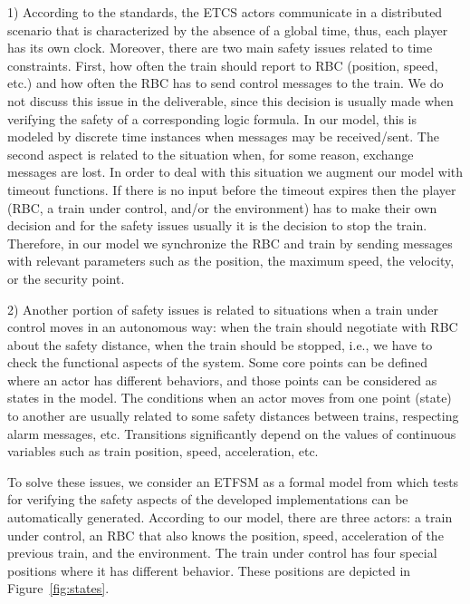 \documentclass{template/openetcs_article}
\begin{document}
1) According to the standards, the ETCS actors communicate in a distributed scenario that is characterized by the absence of a global time, thus, each player has its own clock. Moreover, there are two main safety issues related to time constraints. First, how often the train should report to RBC (position, speed, etc.) and how often the RBC has to send control messages to the train. We do not discuss this issue in the deliverable, since this decision is usually made when verifying the safety of a corresponding logic formula. In our model, this is modeled by discrete time instances when messages may be received/sent. The second aspect is related to the situation when, for some reason, exchange messages are lost. In order to deal with this situation we augment our model with timeout functions. If there is no input before the timeout expires then the player (RBC, a train under control, and/or the environment) has to make their own decision and for the safety issues usually it is the decision to stop the train. Therefore, in our model we synchronize the RBC and train by sending messages with relevant parameters such as the position, the maximum speed, the velocity, or the security point. 

2) Another portion of safety issues is related to situations when a train under control moves in an autonomous way: when the train should negotiate with RBC about the safety distance, when the train should be stopped, i.e., we have to check the functional aspects of the system. Some core points can be defined where an actor has different behaviors, and those points can be considered as states in the model. The conditions when an actor moves from one point (state) to another are usually related to some safety distances between trains, respecting alarm messages, etc. Transitions significantly depend on the values of continuous variables such as train position, speed, acceleration, etc. 

To solve these issues, we consider an ETFSM as a formal model from which tests for verifying the safety aspects of the developed implementations can be automatically generated. According to our model, there are three actors: a train under control, an RBC that also knows the position, speed, acceleration of the previous train, and the environment. The train under control has four special positions where it has different behavior. These positions are depicted in Figure~\ref{fig:states}. 
\end{document}
